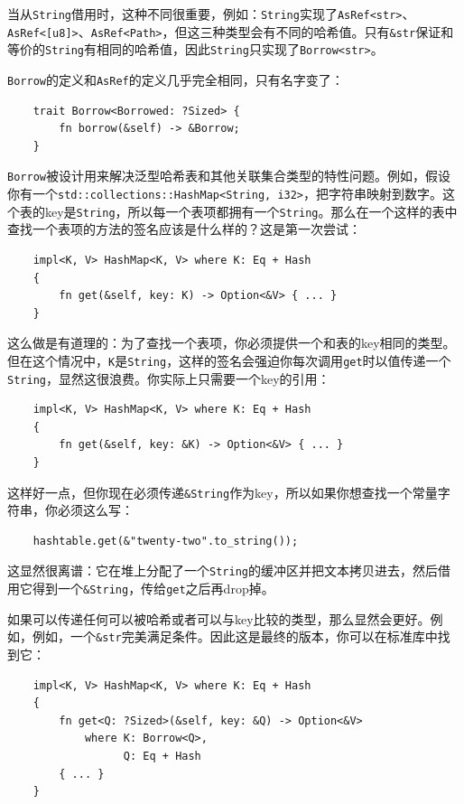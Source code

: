 当从\texttt{String}借用时，这种不同很重要，例如：\texttt{String}实现了\texttt{AsRef<str>}、\texttt{AsRef<[u8]>}、\texttt{AsRef<Path>}，但这三种类型会有不同的哈希值。只有\texttt{\&str}保证和等价的\texttt{String}有相同的哈希值，因此\texttt{String}只实现了\texttt{Borrow<str>}。

\texttt{Borrow}的定义和\texttt{AsRef}的定义几乎完全相同，只有名字变了：
\begin{verbatim}
    trait Borrow<Borrowed: ?Sized> {
        fn borrow(&self) -> &Borrow;
    }
\end{verbatim}

\texttt{Borrow}被设计用来解决泛型哈希表和其他关联集合类型的特性问题。例如，假设你有一个\texttt{std::collections::HashMap<String, i32>}，把字符串映射到数字。这个表的key是\texttt{String}，所以每一个表项都拥有一个\texttt{String}。那么在一个这样的表中查找一个表项的方法的签名应该是什么样的？这是第一次尝试：
\begin{verbatim}
    impl<K, V> HashMap<K, V> where K: Eq + Hash
    {
        fn get(&self, key: K) -> Option<&V> { ... }
    }
\end{verbatim}

这么做是有道理的：为了查找一个表项，你必须提供一个和表的key相同的类型。但在这个情况中，\texttt{K}是\texttt{String}，这样的签名会强迫你每次调用\texttt{get}时以值传递一个\texttt{String}，显然这很浪费。你实际上只需要一个key的引用：
\begin{verbatim}
    impl<K, V> HashMap<K, V> where K: Eq + Hash
    {
        fn get(&self, key: &K) -> Option<&V> { ... }
    }
\end{verbatim}

这样好一点，但你现在必须传递\texttt{\&String}作为key，所以如果你想查找一个常量字符串，你必须这么写：
\begin{verbatim}
    hashtable.get(&"twenty-two".to_string());
\end{verbatim}

这显然很离谱：它在堆上分配了一个\texttt{String}的缓冲区并把文本拷贝进去，然后借用它得到一个\texttt{\&String}，传给\texttt{get}之后再drop掉。

如果可以传递任何可以被哈希或者可以与key比较的类型，那么显然会更好。例如，例如，一个\texttt{\&str}完美满足条件。因此这是最终的版本，你可以在标准库中找到它：
\begin{verbatim}
    impl<K, V> HashMap<K, V> where K: Eq + Hash
    {
        fn get<Q: ?Sized>(&self, key: &Q) -> Option<&V>
            where K: Borrow<Q>,
                  Q: Eq + Hash
        { ... }
    }
\end{verbatim}

